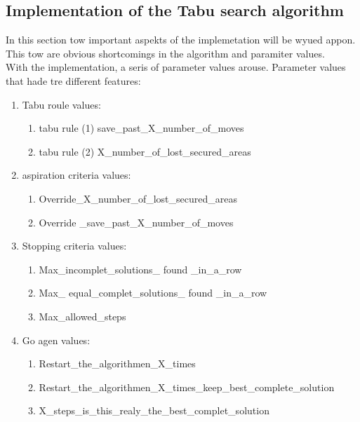 \subsection{Implementation of the Tabu search algorithm}
In this section tow important aspekts of the implemetation will be wyued  appon.
This tow are obvious shortcomings in the algorithm and paramiter values.\\
With the implementation, a seris of parameter values arouse. Parameter values that hade tre different features: 
\begin{enumerate}
\item Tabu roule values:
\begin{enumerate}
\item tabu rule (1)  save\_past\_X\_number\_of\_moves 
\item tabu rule (2)  X\_number\_of\_lost\_secured\_areas
\end{enumerate} 
\item aspiration criteria values:
\begin{enumerate}
\item Override\_X\_number\_of\_lost\_secured\_areas
\item Override \_save\_past\_X\_number\_of\_moves
\end{enumerate} 
\item Stopping criteria values:
\begin{enumerate}
\item Max\_incomplet\_solutions\_ found \_in\_a\_row
\item Max\_ equal\_complet\_solutions\_ found \_in\_a\_row
\item Max\_allowed\_steps
\end{enumerate} 
\item Go agen values:
\begin{enumerate}
\item Restart\_the\_algorithmen\_X\_times
\item Restart\_the\_algorithmen\_X\_times\_keep\_best\_complete\_solution
\item X\_steps\_is\_this\_realy\_the\_best\_complet\_solution
\end{enumerate} 
\end{enumerate} 

